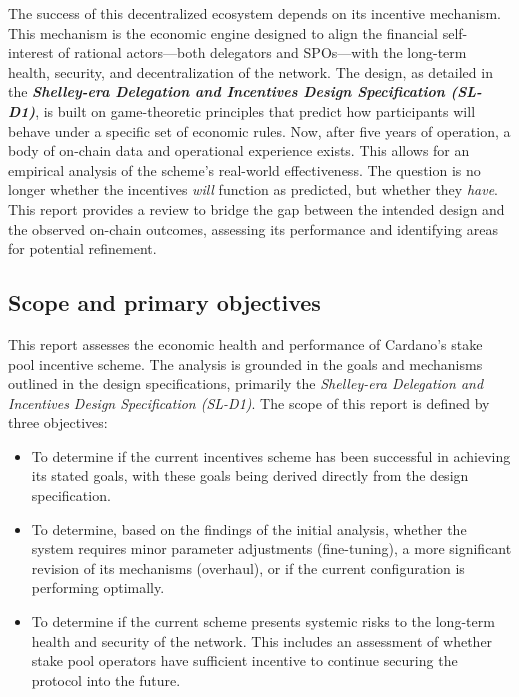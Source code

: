 \documentclass[11pt, letterpaper]{article}
\begin{document}
The success of this decentralized ecosystem depends on its incentive mechanism.
This mechanism is the economic engine designed to align the financial
self-interest of rational actors—both delegators and SPOs—with the long-term
health, security, and decentralization of the network. The design, as detailed
in the \textit{\textbf{Shelley-era Delegation and Incentives Design
		Specification (SL-D1)}}, is built on game-theoretic principles that predict how
participants will behave under a specific set of economic rules. Now, after
five years of operation, a body of on-chain data and operational experience
exists. This allows for an empirical analysis of the scheme's real-world
effectiveness. The question is no longer whether the incentives \textit{will}
function as predicted, but whether they \textit{have}. This report provides a
review to bridge the gap between the intended design and the observed on-chain
outcomes, assessing its performance and identifying areas for potential
refinement.

\subsection{Scope and primary objectives}
This report assesses the economic health and performance of Cardano's stake
pool incentive scheme. The analysis is grounded in the goals and mechanisms
outlined in the design specifications, primarily the \textit{Shelley-era
	Delegation and Incentives Design Specification (SL-D1)}. The scope of this
report is defined by three objectives:

\begin{itemize}
	\item To determine if the current incentives scheme has been successful in achieving
	      its stated goals, with these goals being derived directly from the design
	      specification.
	\item To determine, based on the findings of the initial analysis, whether the system
	      requires minor parameter adjustments (fine-tuning), a more significant revision
	      of its mechanisms (overhaul), or if the current configuration is performing
	      optimally.
	\item To determine if the current scheme presents systemic risks to the long-term
	      health and security of the network. This includes an assessment of whether
	      stake pool operators have sufficient incentive to continue securing the
	      protocol into the future.
\end{itemize}
\end{document}
